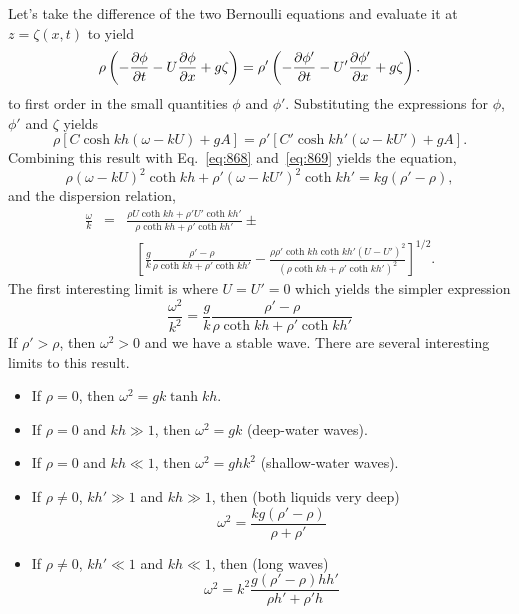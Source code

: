 Let's take the difference of the two Bernoulli equations and evaluate
it at $z=\zeta(x,t)$ to yield
\begin{equation}
\rho \left ( -\frac{\partial {\phi}}{\partial {t}} - U \frac{\partial {\phi}}{\partial {x}} + g \zeta \right )=
\rho' \left ( -\frac{\partial {\phi'}}{\partial {t}} - U' \frac{\partial {\phi'}}{\partial {x}} + g \zeta \right ).
\end{equation}
to first order in the small quantities $\phi$ and $\phi'$.
Substituting the expressions for $\phi$, $\phi'$ and $\zeta$ yields
\begin{equation}
\rho \left [ C \cosh kh \left ( \omega - k U \right ) + g A \right ] = 
\rho' \left [ C' \cosh kh' \left ( \omega - k U' \right ) + g A \right ] .
\end{equation}
Combining this result with Eq.~\ref{eq:868} and~\ref{eq:869} yields
the equation,
\begin{equation}
\rho \left ( \omega - k U \right )^2 \coth kh  +
\rho' \left ( \omega - k U' \right )^2 \coth kh' = k g \left (\rho' -
  \rho \right ),
\end{equation}
and the dispersion relation,
\begin{eqnarray}
\frac{\omega}{k} &=& \frac{\rho U \coth kh + \rho' U'\coth k h'}{\rho
  \coth kh + \rho' \coth k h'} \pm \nonumber \\
& &~~~ \left [ \frac{g}{k} \frac{\rho' - \rho}{\rho
  \coth kh + \rho' \coth k h'} - \frac{\rho \rho' \coth kh \coth kh' \left ( U - U' \right )^2}{\left (\rho
  \coth kh + \rho' \coth k h' \right)^2 } \right ]^{1/2}.
\label{eq:870}
\end{eqnarray}
The first interesting limit is where $U=U'=0$ which yields the simpler expression
\begin{equation}
\frac{\omega^2}{k^2} =  \frac{g}{k} \frac{\rho' - \rho}{\rho \coth k h +
    \rho' \coth k h'} 
\label{eq:769}
\end{equation}
If $\rho' > \rho$, then $\omega^2>0$ and we have a stable wave.  There
are several interesting limits to this result.
\begin{itemize}
\item If $\rho=0$, then $\omega^2 = g k \tanh kh$.
\item If $\rho=0$ and $kh \gg 1$, then $\omega^2 = g k$ (deep-water waves).
\item If $\rho=0$ and $kh \ll 1$, then $\omega^2 = g h k^2$ (shallow-water
  waves).
\item If $\rho\neq 0$, $kh' \gg 1$ and $kh \gg 1$, then (both liquids
  very deep)
\begin{equation}
\omega^2 = \frac{kg (\rho' - \rho)}{\rho+\rho'}
\label{eq:770}
\end{equation}
\item If $\rho\neq 0$, $kh' \ll 1$ and $kh \ll 1$, then (long waves)
\begin{equation}
\omega^2 = k^2 \frac{g (\rho' - \rho) h h'}{\rho h'+\rho' h}
\label{eq:771}
\end{equation}
\end{itemize}

